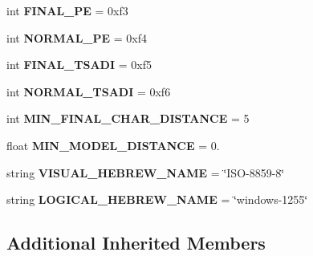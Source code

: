\begin{DoxyCompactItemize}
\mbox{\label{classchardet_1_1hebrewprober_1_1_hebrew_prober_ae6ee4c894cc16044f6250ceffe2d78d7}} 
int {\bfseries F\+I\+N\+A\+L\+\_\+\+PE} = 0xf3
\item 
\mbox{\label{classchardet_1_1hebrewprober_1_1_hebrew_prober_aa32f31506431251216d56c79a5c67623}} 
int {\bfseries N\+O\+R\+M\+A\+L\+\_\+\+PE} = 0xf4
\item 
\mbox{\label{classchardet_1_1hebrewprober_1_1_hebrew_prober_a6afceef86471aefc7edfc0c3336d1e87}} 
int {\bfseries F\+I\+N\+A\+L\+\_\+\+T\+S\+A\+DI} = 0xf5
\item 
\mbox{\label{classchardet_1_1hebrewprober_1_1_hebrew_prober_ac0ebf739525dc29966f257d66b536b87}} 
int {\bfseries N\+O\+R\+M\+A\+L\+\_\+\+T\+S\+A\+DI} = 0xf6
\item 
\mbox{\label{classchardet_1_1hebrewprober_1_1_hebrew_prober_a3018089a9d2eb1e26cdad5af861822de}} 
int {\bfseries M\+I\+N\+\_\+\+F\+I\+N\+A\+L\+\_\+\+C\+H\+A\+R\+\_\+\+D\+I\+S\+T\+A\+N\+CE} = 5
\item 
\mbox{\label{classchardet_1_1hebrewprober_1_1_hebrew_prober_a0519e40071dd89dda56f24132d08bd7e}} 
float {\bfseries M\+I\+N\+\_\+\+M\+O\+D\+E\+L\+\_\+\+D\+I\+S\+T\+A\+N\+CE} = 0.
\item 
\mbox{\label{classchardet_1_1hebrewprober_1_1_hebrew_prober_a9f362bac07c026711815713b0ba42c81}} 
string {\bfseries V\+I\+S\+U\+A\+L\+\_\+\+H\+E\+B\+R\+E\+W\+\_\+\+N\+A\+ME} = \char`\"{}I\+SO-\/8859-\/8\char`\"{}
\item 
\mbox{\label{classchardet_1_1hebrewprober_1_1_hebrew_prober_ad9c5a17e264e0280d94e4076bf986e9c}} 
string {\bfseries L\+O\+G\+I\+C\+A\+L\+\_\+\+H\+E\+B\+R\+E\+W\+\_\+\+N\+A\+ME} = \char`\"{}windows-\/1255\char`\"{}
\end{DoxyCompactItemize}
\subsection*{Additional Inherited Members}


